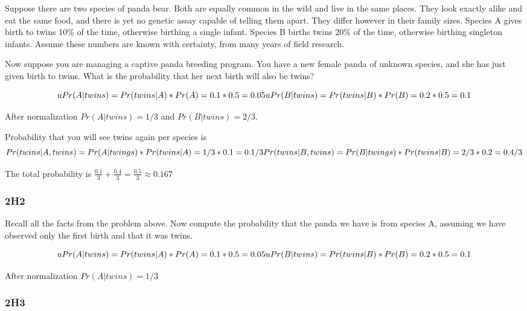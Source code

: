 \documentclass[
]{book}
\begin{document}
Suppose there are two species of panda bear. Both are equally common in the wild and live in the same places. They look exactly alike and eat the same food, and there is yet no genetic assay capable of telling them apart. They differ however in their family sizes. Species A gives birth to twins 10\% of the time, otherwise birthing a single infant. Species B births twins 20\% of the time, otherwise birthing singleton infants. Assume these numbers are known with certainty, from many years of field research.

Now suppose you are managing a captive panda breeding program. You have a new female panda of unknown species, and she has just given birth to twins. What is the probability that her next birth will also be twins?

\[uPr(A | twins) = Pr(twins | A) * Pr(A) = 0.1 * 0.5 = 0.05 \\
uPr(B | twins) = Pr(twins | B) * Pr(B) = 0.2 * 0.5 = 0.1\]

After normalization \(Pr(A | twins) = 1/3\) and \(Pr(B | twins) = 2/3\).

Probability that you will see twins again per species is
\[Pr(twins | A, twins) = Pr(A | twings) * Pr (twins | A) = 1 / 3 * 0.1  = 0.1 / 3 \\
Pr(twins | B, twins) = Pr(B | twings) * Pr (twins | B) = 2 / 3 * 0.2 = 0.4 / 3\]

The total probability is \(\frac{0.1}{3} + \frac{0.4}{3} = \frac{0.5}{3} \approx 0.167\)

\hypertarget{h2}{%
\subsubsection*{2H2}\label{h2}}

Recall all the facts from the problem above. Now compute the probability that the panda we have is from species A, assuming we have observed only the first birth and that it was twins.

\[uPr(A | twins) = Pr(twins | A) * Pr(A) = 0.1 * 0.5 = 0.05 \\
uPr(B | twins) = Pr(twins | B) * Pr(B) = 0.2 * 0.5 = 0.1\]

After normalization \(Pr(A | twins) = 1/3\)

\hypertarget{h3}{%
\subsubsection*{2H3}\label{h3}}
\end{document}
